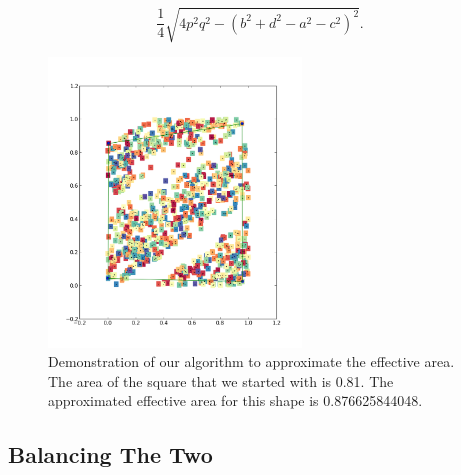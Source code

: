 \documentclass[12pt]{article}
\begin{document}
\begin{equation*}
  \frac{1}{4}\sqrt{4p^2 q^2 - (b^2 + d^2 - a^2 - c^2)^2}.
\end{equation*}
\begin{figure}[t]
  \centering
  \includegraphics[width=0.6\textwidth]{area_approx}
  \caption{Demonstration of our algorithm to approximate the effective area.
  The area of the square that we started with is 0.81.
  The approximated effective area for this shape is 0.876625844048.}
  \label{fig:effarea}
\end{figure}

\subsection{Balancing The Two}
\end{document}
